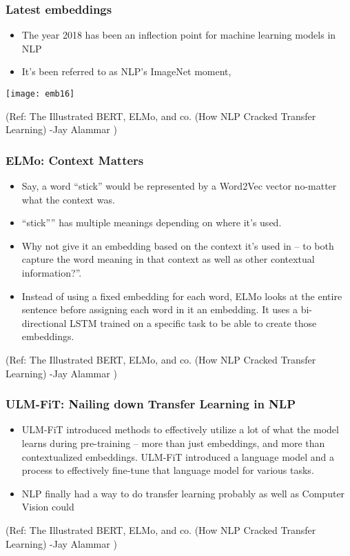 \begin{frame}[fragile]\frametitle{Latest embeddings}

\begin{itemize}
\item  The year 2018 has been an inflection point for machine learning models in NLP 
\item It’s been referred to as NLP’s ImageNet moment,
\end{itemize}

\begin{center}
\texttt{[image: emb16]}
\end{center}

{\tiny (Ref: The Illustrated BERT, ELMo, and co. (How NLP Cracked Transfer Learning) -Jay Alammar )}
\end{frame}

\begin{frame}[fragile]\frametitle{ELMo: Context Matters}
\begin{itemize}
\item  Say, a word “stick” would be represented by a Word2Vec vector no-matter what the context was. 
\item  “stick”” has multiple meanings depending on where it’s used. 
\item Why not give it an embedding based on the context it’s used in – to both capture the word meaning in that context as well as other contextual information?”. 
\item Instead of using a fixed embedding for each word, ELMo looks at the entire sentence before assigning each word in it an embedding. It uses a bi-directional LSTM trained on a specific task to be able to create those embeddings.

\end{itemize}


{\tiny (Ref: The Illustrated BERT, ELMo, and co. (How NLP Cracked Transfer Learning) -Jay Alammar )}
\end{frame}

\begin{frame}[fragile]\frametitle{ULM-FiT: Nailing down Transfer Learning in NLP}
\begin{itemize}
\item  ULM-FiT introduced methods to effectively utilize a lot of what the model learns during pre-training – more than just embeddings, and more than contextualized embeddings. ULM-FiT introduced a language model and a process to effectively fine-tune that language model for various tasks.
\item NLP finally had a way to do transfer learning probably as well as Computer Vision could
\end{itemize}


{\tiny (Ref: The Illustrated BERT, ELMo, and co. (How NLP Cracked Transfer Learning) -Jay Alammar )}
\end{frame}

